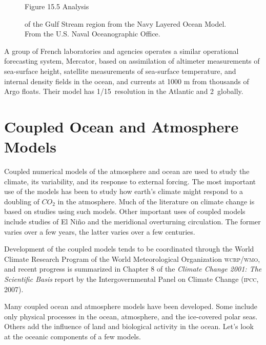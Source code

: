 \begin{figure}[h!]
\centering
\vspace{-1ex}
\footnotesize
Figure 15.5 Analysis \rule{0mm}{4ex}of the Gulf Stream region from the Navy Layered Ocean
Model.\\From the U.S. Naval Oceanographic Office.

\label{fig:nlom-gulfstream}
\vspace{-3ex}
\end{figure}

A group of French laboratories and agencies operates a similar
operational forecasting system, Mercator, based on assimilation of altimeter
measurements of sea-surface height, satellite measurements of
sea-surface temperature, and internal density fields in the ocean, and
currents at 1000 m from thousands of Argo
floats. Their model has 1/15\degrees\ resolution in
the Atlantic and 2\degrees\ globally.

\section{Coupled Ocean and Atmosphere Models}
Coupled numerical models of the
atmosphere and ocean are used to study the climate, its variability,
and its response to external forcing. The most important use of the
models has been to study how earth's climate might respond to a
doubling of $CO_{2}$ in the atmosphere. Much of the literature on
climate change is based on studies using such models. Other important
uses of coupled models include studies of El Ni\~{n}o and the
meridional overturning circulation. The former varies over a few years, the latter varies
over a few centuries.

Development of the coupled models tends to be coordinated through the
World Climate Research Program of the World Meteorological
Organization \textsc{wcrp/wmo}, and recent progress is summarized in
Chapter 8 of the \textit{Climate Change 2001: The Scientific Basis}
report by the Intergovernmental Panel on Climate Change
(\textsc{ipcc}, 2007).

Many coupled ocean and atmosphere models have been developed. Some
include only physical processes in the ocean, atmosphere, and the
ice-covered polar seas. Others add the influence of land and
biological activity in the ocean. Let's look at the oceanic components
of a few models.

